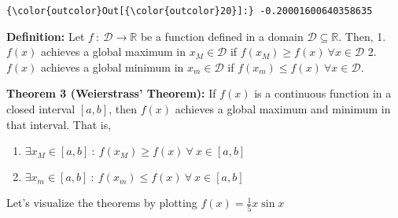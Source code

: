 \documentclass[11pt]{article}
\providecommand{\tightlist}{%
      \setlength{\itemsep}{0pt}\setlength{\parskip}{0pt}}
\begin{document}
\begin{Verbatim}[commandchars=\\\{\}]
{\color{outcolor}Out[{\color{outcolor}20}]:} -0.20001600640358635
\end{Verbatim}
            
    \textbf{Definition:} Let \(f \ : \ \mathcal{D} \rightarrow \mathbb{R}\)
be a function defined in a domain \(\mathcal{D}\subseteq\mathbb{R}\).
Then, 1. \(f(x)\) achieves a global maximum in \(x_M\in\mathcal{D}\) if
\(f(x_M) \geq f(x) \ \forall x\in\mathcal{D}\) 2. \(f(x)\) achieves a
global minimum in \(x_m\in\mathcal{D}\) if
\(f(x_m) \leq f(x) \ \forall x\in\mathcal{D}\).

\textbf{Theorem 3 (Weierstrass' Theorem):} If \(f(x)\) is a continuous
function in a closed interval \([a,b]\), then \(f(x)\) achieves a global
maximum and minimum in that interval. That is,

\begin{enumerate}
\def\labelenumi{\arabic{enumi}.}
\tightlist
\item
  \(\exists x_M \in [a,b] \ : \ f(x_M) \geq f(x) \ \forall \ x\in[a,b]\)
\item
  \(\exists x_m \in [a,b] \ : \ f(x_m) \leq f(x) \ \forall \ x\in[a,b]\)
\end{enumerate}

Let's visualize the theorems by plotting \(f(x) = \frac{1}{5}x\sin{x}\)
\end{document}
